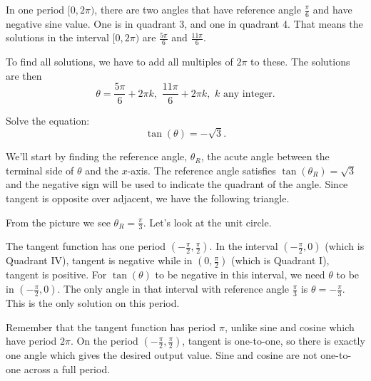 \documentclass[nooutcomes]{ximera}
\begin{document}
\begin{example}
\begin{explanation}
In one period $[0, 2\pi)$, there are two angles that have reference angle $\frac{\pi}{6}$ and have negative
		sine value.  One is in quadrant 3, and one in quadrant 4.  That means the solutions in the interval $[0, 2\pi)$ are $\frac{5\pi}{6}$ and $\frac{11\pi}{6}$.
		
		To find all solutions, we have to add all multiples of $2\pi$ to these.  The solutions are then $$ \theta = \frac{5\pi}{6} + 2\pi k , \,\, \frac{11\pi}{6}+2\pi k , \,\, k \textrm{ any integer}. $$
	\end{explanation}
\end{example}

\begin{example}
	Solve the equation: \[ \tan(\theta) = -\sqrt{3}. \]

	\begin{explanation}
		We'll start by finding the reference angle, $\theta_R$, the acute angle between the terminal side of $\theta$ and the $x$-axis.  
		The reference angle satisfies $\tan(\theta_R) = \sqrt{3}$ and the negative sign will be used to indicate the quadrant of the angle.
		Since tangent is opposite over adjacent, we have the following triangle.
		\begin{image}[2in]
		\end{image}
		From the picture we see $\theta_R = \frac{\pi}{3}$.  Let's look at the unit circle.		
	
		The tangent function has one period $\left( -\frac{\pi}{2}, \frac{\pi}{2}\right)$. In the interval $\left( -\frac{\pi}{2}, 0\right)$ 
		(which is Quadrant IV), tangent is negative while in $\left( 0, \frac{\pi}{2}\right)$ (which is Quadrant I), tangent is positive.
		For $\tan(\theta)$ to be negative in this interval, we need $\theta$ to be in $\left( -\frac{\pi}{2}, 0\right)$. The only angle in
		that interval with reference angle $\frac{\pi}{3}$ is $\theta = -\frac{\pi}{3}$. This is the only solution on this period.
		\begin{callout}
			Remember that the tangent function has period $\pi$, unlike sine and cosine which have period $2\pi$. On the period
			$\left( -\frac{\pi}{2}, \frac{\pi}{2}\right)$, tangent is one-to-one, so there is exactly one angle which gives the desired
			output value. Sine and cosine are not one-to-one across a full period.
		\end{callout}
		

\end{explanation}
\end{example}
\end{document}
